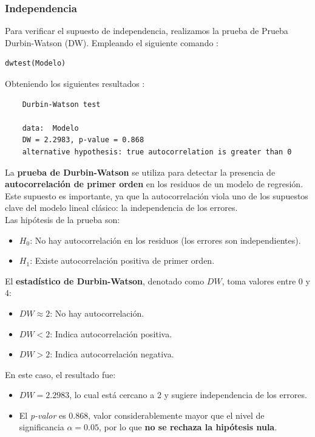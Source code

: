 \documentclass{rapport}
\begin{document}
\subsubsection{Independencia}
Para verificar el supuesto de independencia, realizamos la prueba de Prueba Durbin-Watson (DW).  Empleando el siguiente comando : 

\begin{lstlisting}[style=rstyle]
dwtest(Modelo)
\end{lstlisting}

Obteniendo los siguientes resultados : 
\begin{verbatim}
    Durbin-Watson test

    data:  Modelo
    DW = 2.2983, p-value = 0.868
    alternative hypothesis: true autocorrelation is greater than 0
\end{verbatim}

La \textbf{prueba de Durbin-Watson} se utiliza para detectar la presencia de \textbf{autocorrelación de primer orden} en los residuos de un modelo de regresión. Este supuesto es importante, ya que la autocorrelación viola uno de los supuestos clave del modelo lineal clásico: la independencia de los errores.\\

Las hipótesis de la prueba son:
\begin{itemize}
    \item \( H_0 \): No hay autocorrelación en los residuos (los errores son independientes).
    \item \( H_1 \): Existe autocorrelación positiva de primer orden.
\end{itemize}

El \textbf{estadístico de Durbin-Watson}, denotado como \( DW \), toma valores entre 0 y 4:
\begin{itemize}
    \item \( DW \approx 2 \): No hay autocorrelación.
    \item \( DW < 2 \): Indica autocorrelación positiva.
    \item \( DW > 2 \): Indica autocorrelación negativa.
\end{itemize}

En este caso, el resultado fue:
\begin{itemize}
    \item \( DW = 2.2983 \), lo cual está cercano a 2 y sugiere independencia de los errores.
    \item El \textit{p-valor} es 0.868, valor considerablemente mayor que el nivel de significancia \(\alpha = 0.05\), por lo que \textbf{no se rechaza la hipótesis nula}.
\end{itemize}\cite{cerda2002diseno}
\end{document}
